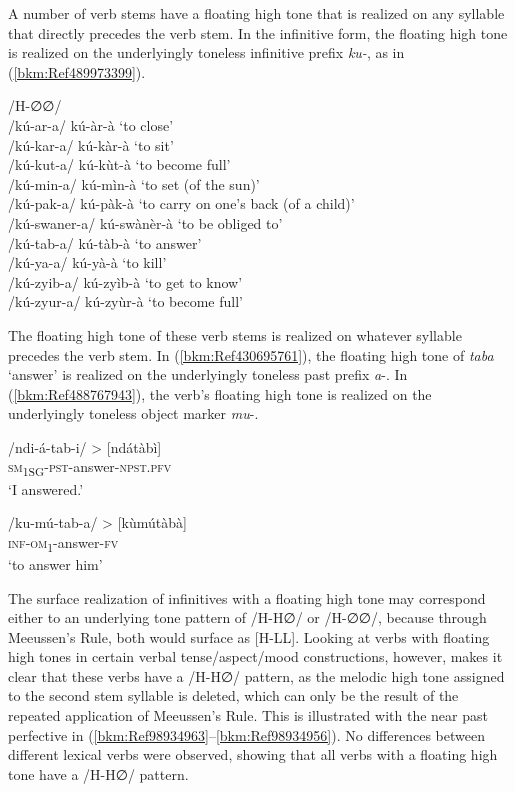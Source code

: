 A number of verb stems have a floating high tone that is realized on any syllable that directly precedes the verb stem. In the infinitive form, the floating high tone is realized on the underly\-ingly toneless infinitive prefix \textit{ku-}, as in (\ref{bkm:Ref489973399}).

\ea
\label{bkm:Ref489973399}
/H-∅∅/ \tab [H-LL] \tab \\
/kú-ar-a/ \tab kú-àr-à \tab ‘to close’\\
/kú-kar-a/ \tab kú-kàr-à \tab ‘to sit’\\
/kú-kut-a/ \tab kú-kùt-à \tab ‘to become full’\\
/kú-min-a/ \tab kú-mìn-à \tab ‘to set (of the sun)’\\
/kú-pak-a/ \tab kú-pàk-à \tab ‘to carry on one’s back (of a child)’\\
/kú-swaner-a/ \tab kú-swànèr-à \tab ‘to be obliged to’\\
/kú-tab-a/ \tab kú-tàb-à \tab ‘to answer’\\
/kú-ya-a/ \tab kú-yà-à \tab ‘to kill’\\
/kú-zyib-a/ \tab kú-zyìb-à \tab ‘to get to know’\\
/kú-zyur-a/ \tab kú-zyùr-à \tab ‘to become full’\\
\z

The floating high tone of these verb stems is realized on whatever syllable precedes the verb stem. In (\ref{bkm:Ref430695761}), the floating high tone of \textit{taba} ‘answer’ is realized on the underlyingly toneless past prefix \textit{a}-. In (\ref{bkm:Ref488767943}), the verb’s floating high tone is realized on the underlyingly toneless object marker \textit{mu}-.

\ea
\label{bkm:Ref430695761}
/ndi-á-tab-i/ > [ndátàbì]\\
\textsc{sm}\textsubscript{1SG}-\textsc{pst}-answer-\textsc{npst}.\textsc{pfv}\\
\glt ‘I answered.’
\z

\ea
\label{bkm:Ref488767943}
/ku-mú-tab-a/ > [kùmútàbà]\\
\textsc{inf}-\textsc{om}\textsubscript{1}-answer-\textsc{fv}\\
\glt ‘to answer him’
\z

\begin{sloppypar}
The surface realization of infinitives with a floating high tone may correspond either to an un\-derlying tone pattern of /H-H∅/ or /H-∅∅/, because through Meeus\-sen’s Rule, both would surface as [H-LL]. Looking at verbs with floating high tones in certain verbal tense/aspect/mood constructions, however, makes it clear that these verbs have a /H-H∅/ pattern, as the melodic high tone assigned to the second stem syllable is deleted, which can only be the result of the repeated application of Meeussen’s Rule. This is illustrated with the near past perfective in (\ref{bkm:Ref98934963}--\ref{bkm:Ref98934956}). No differences between different lexical verbs were observed, showing that all verbs with a floating high tone have a /H-H∅/ pattern.
\end{sloppypar}\largerpage

